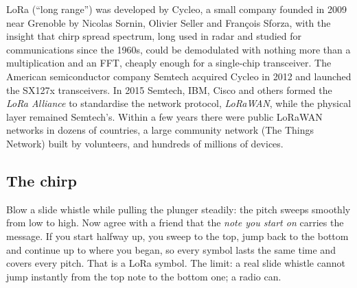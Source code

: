 \begin{history}
LoRa (``long range'') was developed by Cycleo, a small company founded in 2009 near Grenoble by
Nicolas Sornin, Olivier Seller and François Sforza, with the insight that chirp spread spectrum, long
used in radar and studied for communications since the 1960s, could be demodulated with nothing more
than a multiplication and an FFT, cheaply enough for a single-chip transceiver. The American
semiconductor company Semtech acquired Cycleo in 2012 and launched the SX127x transceivers. In 2015
Semtech, IBM, Cisco and others formed the \emph{LoRa Alliance} to standardise the network protocol,
\emph{LoRaWAN}, while the physical layer remained Semtech's. Within a few years there were public
LoRaWAN networks in dozens of countries, a large community network (The Things Network) built by
volunteers, and hundreds of millions of devices.
\end{history}


\subsection{The chirp}

\begin{analogy}
Blow a slide whistle while pulling the plunger steadily: the pitch sweeps smoothly from low to high.
Now agree with a friend that the \emph{note you start on} carries the message. If you start halfway
up, you sweep to the top, jump back to the bottom and continue up to where you began, so every
symbol lasts the same time and covers every pitch. That is a LoRa symbol. The limit: a real slide
whistle cannot jump instantly from the top note to the bottom one; a radio can.
\end{analogy}

